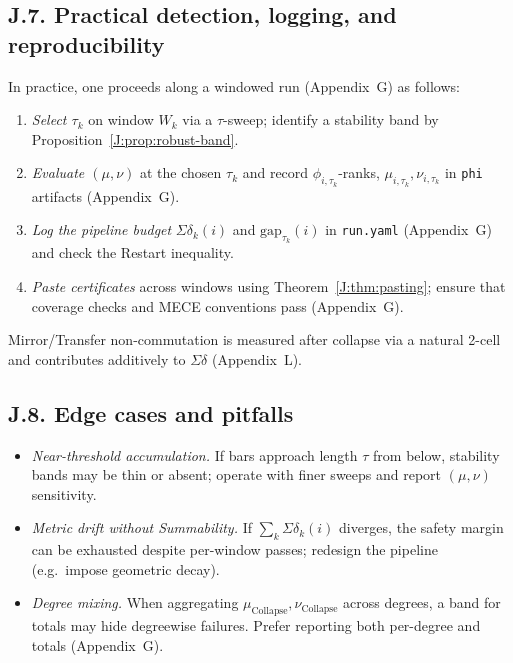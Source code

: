\documentclass[11pt]{article}
\numberwithin{equation}{section}
\theoremstyle{plain}
\theoremstyle{definition}
\theoremstyle{remark}
\theoremstyle{plain}
\theoremstyle{definition}
\numberwithin{equation}{section}
\theoremstyle{definition}
\DeclareRobustCommand{\muc}{\mu_{\mathrm{Collapse}}}
\DeclareRobustCommand{\nuc}{\nu_{\mathrm{Collapse}}}
\numberwithin{equation}{section}
\theoremstyle{plain}
\theoremstyle{definition}
\theoremstyle{remark}
\providecommand{\muc}{\mu_{\mathrm{Collapse}}}
\providecommand{\nuc}{\nu_{\mathrm{Collapse}}}
\begin{document}
\subsection*{J.7. Practical detection, logging, and reproducibility}
In practice, one proceeds along a windowed run (Appendix~G) as follows:
\begin{enumerate}\itemsep0.25em
  \item \emph{Select \(\tau_k\)} on window \(W_k\) via a \(\tau\)-sweep; identify a stability band by Proposition~\ref{J:prop:robust-band}.
  \item \emph{Evaluate \((\mu,\nu)\)} at the chosen \(\tau_k\) and record \(\phi_{i,\tau_k}\)-ranks, \(\mu_{i,\tau_k},\nu_{i,\tau_k}\) in \texttt{phi} artifacts (Appendix~G).
  \item \emph{Log the pipeline budget} \(\Sigma\delta_k(i)\) and \(\mathrm{gap}_{\tau_k}(i)\) in \texttt{run.yaml} (Appendix~G) and check the Restart inequality.
  \item \emph{Paste certificates} across windows using Theorem~\ref{J:thm:pasting}; ensure that coverage checks and MECE conventions pass (Appendix~G).
\end{enumerate}
Mirror/Transfer non-commutation is measured after collapse via a natural 2-cell and contributes additively to \(\Sigma\delta\) (Appendix~L).

\subsection*{J.8. Edge cases and pitfalls}
\begin{itemize}\itemsep0.25em
  \item \emph{Near-threshold accumulation.} If bars approach length \(\tau\) from below, stability bands may be thin or absent; operate with finer sweeps and report \((\mu,\nu)\) sensitivity.
  \item \emph{Metric drift without Summability.} If \(\sum_k\Sigma\delta_k(i)\) diverges, the safety margin can be exhausted despite per-window passes; redesign the pipeline (e.g.\ impose geometric decay).
  \item \emph{Degree mixing.} When aggregating \(\muc,\nuc\) across degrees, a band for totals may hide degreewise failures. Prefer reporting both per-degree and totals (Appendix~G).
\end{itemize}
\end{document}
